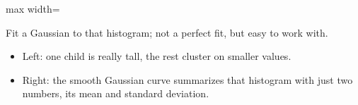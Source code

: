 \begin{frame}[fragile]
{\begin{minipage}{0.47\linewidth}
\begin{center}
\begin{adjustbox}{max width=\linewidth}
\end{adjustbox}
\end{center}
\tiny{Fit a Gaussian to that histogram; not a perfect fit, but easy to work with.}
\end{minipage}%
}

\begin{itemize}
\item Left: one child is really tall, the rest cluster on smaller values.
\item Right: the smooth Gaussian curve summarizes that histogram with just two numbers, its mean and standard deviation.
\end{itemize}
\end{frame}

